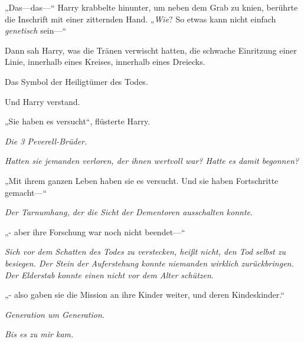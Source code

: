 „Das—das—“ Harry krabbelte hinunter, um neben dem Grab zu knien, berührte die Inschrift mit einer zitternden Hand. „\emph{Wie}? So etwas kann nicht einfach \emph{genetisch} sein—“

Dann sah Harry, was die Tränen verwischt hatten, die schwache Einritzung einer Linie, innerhalb eines Kreises, innerhalb eines Dreiecks.

Das Symbol der Heiligtümer des Todes.

Und Harry verstand.

„Sie haben es versucht“, flüsterte Harry.

\emph{Die 3 Peverell-Brüder.}

\emph{Hatten sie jemanden verloren, der ihnen wertvoll war? Hatte es damit begonnen?}

„Mit ihrem ganzen Leben haben sie es versucht. Und sie haben Fortschritte gemacht—“

\emph{Der Tarnumhang, der die Sicht der Dementoren ausschalten konnte}.

 „- aber ihre Forschung war noch nicht beendet—“

\emph{Sich vor dem Schatten des Todes zu verstecken, heißt nicht, den Tod selbst zu besiegen. Der Stein der Auferstehung konnte niemanden wirklich zurückbringen. Der Elderstab konnte einen nicht vor dem Alter schützen}.

„- also gaben sie die Mission an ihre Kinder weiter, und deren Kindeskinder.“

\emph{Generation um Generation.}

\emph{Bis es zu mir kam.}


